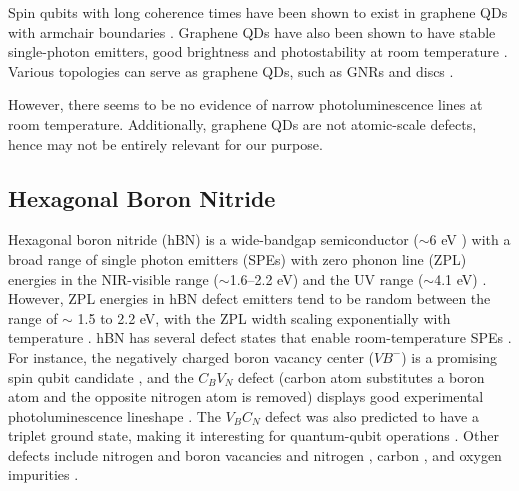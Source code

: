 \documentclass[]{article}
\begin{document}
Spin qubits with long coherence times have been shown to exist in graphene QDs with armchair boundaries \cite{spin_qubits_GQD}. Graphene QDs have also been shown to have stable single-photon emitters, good brightness and photostability at room temperature \cite{SPE_QD_room_temp}. Various topologies can serve as graphene QDs, such as GNRs and discs \cite{QD_spin_qubits_graphene}. 
\newline

However, there seems to be no evidence of narrow photoluminescence lines at room temperature. Additionally, graphene QDs are not atomic-scale defects, hence may not be entirely relevant for our purpose.

\subsection{Hexagonal Boron Nitride}

Hexagonal boron nitride (hBN) is a wide-bandgap semiconductor ($\sim$6 eV \cite{2D_materials_for_quantum_information_science, hBN_cavity_optomechanics, SP_sources_atomically_thin_materials_review}) with a broad range of single photon emitters (SPEs) with zero phonon line (ZPL) energies in the NIR-visible range ($\sim$1.6–2.2 eV) and the UV range ($\sim$4.1 eV) \cite{SP_sources_atomically_thin_materials_review, ultrviolet_SPE_hBN}. However, ZPL energies in hBN defect emitters tend to be random between the range of $\sim$ 1.5 to 2.2 eV, with the ZPL width scaling exponentially with temperature \cite{SP_sources_atomically_thin_materials_review}. hBN has several defect states that enable room-temperature SPEs \cite{carbon_source_SPE_hBN, first_principles_quantum_emission_hBN, hBN_cavity_optomechanics, quantum_emission_hBN_monolayers, spin_defects_hBN, structural_electronic_properties_hBN}. For instance, the negatively charged boron vacancy center ($VB^{-}$) is a promising spin qubit candidate \cite{spin_defects_hBN, ab_initio_VBneg_hBN}, and the $C_B V_N$ defect (carbon atom substitutes a boron atom and the opposite nitrogen atom is removed) displays good experimental photoluminescence lineshape \cite{first_principles_quantum_emission_hBN}. The $V_B C_N$ defect was also predicted to have a triplet ground state, making it interesting for quantum-qubit operations \cite{hBN_Triplet_GS}. Other defects include nitrogen and boron vacancies \cite{quantum_emission_hBN_monolayers, spin_defects_hBN, ab_initio_VBneg_hBN} and nitrogen \cite{hBN_Triplet_GS}, carbon \cite{carbon_source_SPE_hBN, defective_graphene_domains_hBN}, and oxygen impurities \cite{SPE_Plasma_treated_hBN, SP_sources_atomically_thin_materials_review}.
\newline
\end{document}

